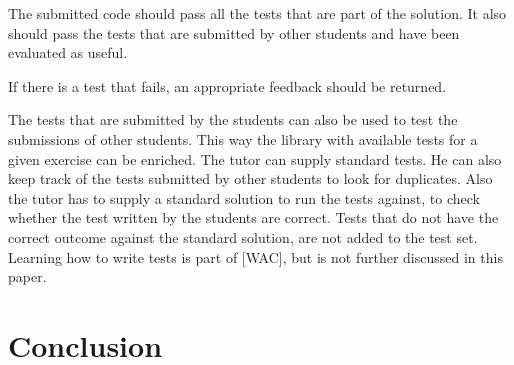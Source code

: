\documentclass{article}
\begin{document}
The submitted code should pass all the tests that are part of the solution. It
also should pass the tests that are submitted by other students and have been
evaluated as useful.

If there is a test that fails, an appropriate feedback should be returned. 

The tests that are submitted by the students can also be used to test the 
submissions of other students. This way the library with available tests for a
given exercise can be enriched.
The tutor can supply standard tests. He can also keep track of the tests
submitted by other students to look for duplicates.
Also the tutor has to supply a standard solution to run the tests against, to
check whether the test written by the students are correct.
Tests that do not have the correct outcome against the standard solution, are
not added to the test set.
Learning how to write tests is part of [WAC], but is not further discussed in
this paper.

\section{Conclusion}
\end{document}
